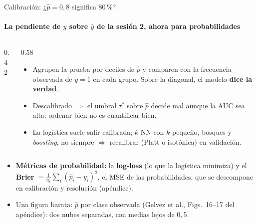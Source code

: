 \documentclass{beamer}
\newcommand{\1}{\mathbb{I}}
\begin{document}
\begin{frame}{Calibración: ¿$\hat{p} = 0{,}8$ significa 80\,\%?}
\framesubtitle{La pendiente de $y$ sobre $\hat{y}$ de la sesión 2, ahora para probabilidades}
\small
\begin{columns}[T]
\begin{column}{0.42\textwidth}
\begin{center}
\end{center}
\end{column}
\begin{column}{0.58\textwidth}
\vspace{0.05cm}
\begin{itemize}\itemsep3pt
  \item Agrupen la prueba por deciles de $\hat{p}$ y comparen con la frecuencia observada de $y = 1$ en cada grupo. Sobre la diagonal, el modelo \textbf{dice la verdad}.
  \item Descalibrado $\Rightarrow$ el umbral $\tau^*$ sobre $\hat{p}$ decide mal aunque la AUC sea alta: ordenar bien no es cuantificar bien.
  \item La logística suele salir calibrada; $k$-NN con $k$ pequeño, bosques y \emph{boosting}, no siempre $\Rightarrow$ recalibrar (Platt o isotónica) en validación.
\end{itemize}
\end{column}
\end{columns}
\pause
\vspace{0.1cm}
\begin{itemize}\itemsep3pt
  \item \textbf{Métricas de probabilidad:} la \textbf{log-loss} (lo que la logística minimiza) y el \textbf{Brier} $= \frac{1}{n_t}\sum_i (\hat{p}_i - y_i)^2$, el MSE de las probabilidades, que se descompone en calibración y resolución (apéndice).
  \item Una figura barata: $\hat{p}$ por clase observada (Gelvez et al., Figs.\ 16--17 del apéndice): dos nubes separadas, con medias lejos de $0{,}5$.
\end{itemize}
\end{frame}
\end{document}
